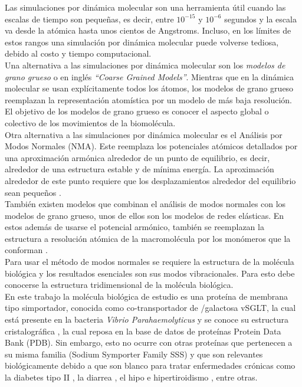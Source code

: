 Las simulaciones por din\'{a}mica molecular son una herramienta \'{u}til cuando las escalas de tiempo son peque\~{n}as, es decir, entre $10^{-15}$ y  $10^{-6}$ segundos y la escala va desde la at\'{o}mica hasta unos cientos de Angstroms. Incluso, en los l\'{i}mites de estos rangos una simulaci\'{o}n por din\'{a}mica molecular puede volverse tediosa, debido al costo y tiempo computacional.\\

Una alternativa a las simulaciones por din\'{a}mica molecular son los \textit{modelos de grano grueso} o en ingl\'{e}s \textit{``Coarse Grained Models''}.  Mientras que en la din\'{a}mica molecular se usan expl\'{i}citamente todos los \'{a}tomos, los modelos de grano grueso reemplazan la representaci\'{o}n atom\'{i}stica por un modelo de m\'{a}s baja resoluci\'{o}n. El objetivo de los modelos de grano grueso es conocer el aspecto global o colectivo de los movimientos de la biomol\'{e}cula.\\

Otra alternativa a las simulaciones por din\'{a}mica molecular es el An\'{a}lisis por Modos Normales (NMA). Este reemplaza los potenciales at\'{o}micos detallados por una aproximaci\'{o}n arm\'{o}nica alrededor de un punto de equilibrio, es decir, alrededor de una estructura estable y de m\'{i}nima energ\'{i}a. La aproximaci\'{o}n alrededor de este punto requiere que los desplazamientos alrededor del equilibrio sean peque\~{n}os \cite{Lezon2009}.\\

Tambi\'{e}n existen modelos que combinan el an\'{a}lisis de modos normales con los modelos de grano grueso, unos de ellos son los modelos de redes el\'{a}sticas. En estos adem\'{a}s de usarse el potencial arm\'{o}nico, tambi\'{e}n se reemplazan la estructura a resoluci\'{o}n at\'{o}mica de la macromol\'{e}cula por los mon\'{o}meros que la conforman \cite{Lezon2009}.\\

Para usar el m\'{e}todo de modos normales se requiere la estructura de la mol\'{e}cula biol\'{o}gica y los resultados esenciales son sus modos vibracionales. Para esto debe conocerse la estructura tridimensional de la mol\'{e}cula biol\'{o}gica.\\

En este trabajo la mol\'{e}cula biol\'{o}gica de estudio es una prote\'{i}na de membrana tipo simportador, conocida como co-transportador de /galactosa vSGLT, la cual est\'{a} presente en la bacteria \textit{Vibrio Parahaemolyticus} y se conoce su estructura cristalogr\'{a}fica \cite{Faham2008}, la cual reposa en la base de datos de prote\'{i}nas Protein Data Bank (PDB). Sin embargo, esto no ocurre con otras prote\'{i}nas que pertenecen a su misma familia (Sodium Symporter Family SSS) y que son relevantes biol\'{o}gicamente debido a que son blanco  para tratar enfermedades cr\'{o}nicas como la diabetes tipo II \cite{Bisha2014}, la diarrea \cite{Hamilton2013}, el hipo e hipertiroidismo \cite{Ferrandino2016}, entre otras.\\

